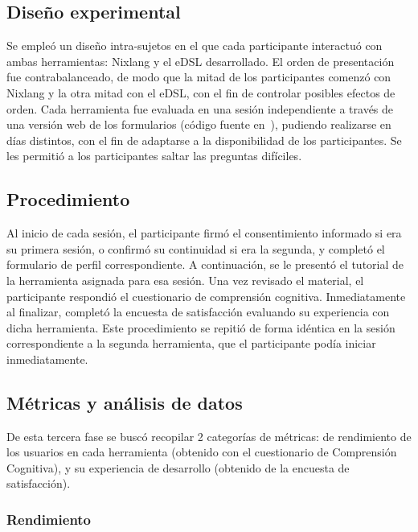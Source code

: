 \subsection{Diseño experimental}

Se empleó un diseño intra-sujetos en el que cada participante interactuó con ambas herramientas: Nixlang y el eDSL desarrollado. El orden de presentación fue contrabalanceado, de modo que la mitad de los participantes comenzó con Nixlang y la otra mitad con el eDSL, con el fin de controlar posibles efectos de orden. Cada herramienta fue evaluada en una sesión independiente a través de una versión web de los formularios (código fuente en~\cite{rayoNixEveryoneRepository}), pudiendo realizarse en días distintos, con el fin de adaptarse a la disponibilidad de los participantes. Se les permitió a los participantes saltar las preguntas difíciles.

\subsection{Procedimiento}

Al inicio de cada sesión, el participante firmó el consentimiento informado si era su primera sesión, o confirmó su continuidad si era la segunda, y completó el formulario de perfil correspondiente. A continuación, se le presentó el tutorial de la herramienta asignada para esa sesión. Una vez revisado el material, el participante respondió el cuestionario de comprensión cognitiva. Inmediatamente al finalizar, completó la encuesta de satisfacción evaluando su experiencia con dicha herramienta. Este procedimiento se repitió de forma idéntica en la sesión correspondiente a la segunda herramienta, que el participante podía iniciar inmediatamente.

\subsection{Métricas y análisis de datos}

De esta tercera fase se buscó recopilar 2 categorías de métricas: de rendimiento de los usuarios en cada herramienta (obtenido con el cuestionario de Comprensión Cognitiva), y su experiencia de desarrollo (obtenido de la encuesta de satisfacción).

\subsubsection{Rendimiento}

